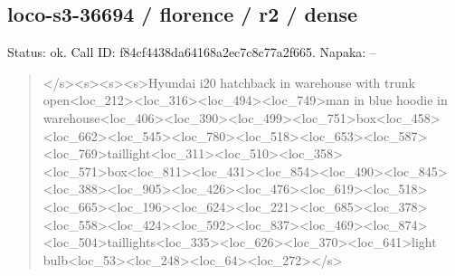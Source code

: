 \documentclass[10pt,a4paper]{article}
\begin{document}
\subsection*{loco-s3-36694 / florence / r2 / dense}
Status: ok. Call ID: f84cf4438da64168a2ec7c8c77a2f665. Napaka: --
\begin{quote}\footnotesize
</s>\allowbreak{}<s>\allowbreak{}<s>\allowbreak{}<s>\allowbreak{}Hyundai i20 hatchback in warehouse with trunk open<loc\_212>\allowbreak{}<loc\_316>\allowbreak{}<loc\_494>\allowbreak{}<\allowbreak{}loc\_749>\allowbreak{}man in blue hoodie in warehouse<loc\_406>\allowbreak{}<loc\_390>\allowbreak{}<loc\_\allowbreak{}499>\allowbreak{}<loc\_751>\allowbreak{}box<loc\_458>\allowbreak{}<loc\_66\allowbreak{}2>\allowbreak{}<loc\_545>\allowbreak{}<loc\_780>\allowbreak{}<loc\_518>\allowbreak{}<lo\allowbreak{}c\_653>\allowbreak{}<loc\_587>\allowbreak{}<loc\_769>\allowbreak{}tailligh\allowbreak{}t<loc\_311>\allowbreak{}<loc\_510>\allowbreak{}<loc\_358>\allowbreak{}<loc\allowbreak{}\_571>\allowbreak{}box<loc\_811>\allowbreak{}<loc\_431>\allowbreak{}<loc\_8\allowbreak{}54>\allowbreak{}<loc\_490>\allowbreak{}<loc\_845>\allowbreak{}<loc\_388>\allowbreak{}<l\allowbreak{}oc\_905>\allowbreak{}<loc\_426>\allowbreak{}<loc\_476>\allowbreak{}<loc\_61\allowbreak{}9>\allowbreak{}<loc\_518>\allowbreak{}<loc\_665>\allowbreak{}<loc\_196>\allowbreak{}<lo\allowbreak{}c\_624>\allowbreak{}<loc\_221>\allowbreak{}<loc\_685>\allowbreak{}<loc\_378\allowbreak{}>\allowbreak{}<loc\_558>\allowbreak{}<loc\_424>\allowbreak{}<loc\_592>\allowbreak{}<loc\allowbreak{}\_837>\allowbreak{}<loc\_469>\allowbreak{}<loc\_874>\allowbreak{}<loc\_504>\allowbreak{}\allowbreak{}taillights<loc\_335>\allowbreak{}<loc\_626>\allowbreak{}<loc\allowbreak{}\_370>\allowbreak{}<loc\_641>\allowbreak{}light bulb<loc\_53>\allowbreak{}<loc\_248>\allowbreak{}<loc\_64>\allowbreak{}<lo\allowbreak{}c\_272>\allowbreak{}</s>\allowbreak{}
\end{quote}
\end{document}

